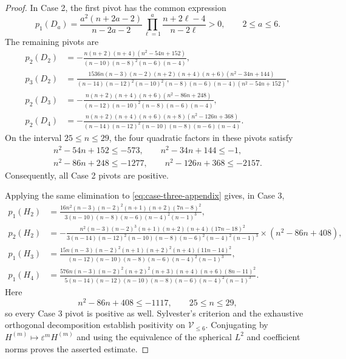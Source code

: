 \documentclass[11pt]{article}
\numberwithin{equation}{section}
\theoremstyle{remark}
\begin{document}
\begin{proof}
 In Case  2, the first pivot has the common expression
{
\begin{equation*}
 p_1(D_a)=\frac{a^2(n+2a-2)}{n-2a-2}
 \prod_{\ell=1}^a\frac{n+2\ell-4}{n-2\ell}>0,
 \qquad 2\le a\le6.
\end{equation*}
}
 The remaining pivots are
{
\begin{align*}
 p_2(D_2)
 &=-\frac{n(n+2)(n+4)(n^2-54n+152)}
 {(n-10)(n-8)^2(n-6)(n-4)},\\
 p_3(D_2)
 &=\frac{1536n(n-3)(n-2)(n+2)(n+4)(n+6)(n^2-34n+144)}
 {(n-14)(n-12)^2(n-10)^2(n-8)(n-6)(n-4)(n^2-54n+152)},\\
 p_2(D_3)
 &=-\frac{n(n+2)(n+4)(n+6)(n^2-86n+248)}
 {(n-12)(n-10)^2(n-8)(n-6)(n-4)},\\
 p_2(D_4)
 &=-\frac{n(n+2)(n+4)(n+6)(n+8)(n^2-126n+368)}
 {(n-14)(n-12)^2(n-10)(n-8)(n-6)(n-4)}.
\end{align*}
}
 On the interval $25\le n\le29$, the four quadratic factors in these
pivots satisfy
{
\begin{equation*}
\begin{gathered}
 n^2-54n+152\le-573,
 \qquad n^2-34n+144\le-1,\\
 n^2-86n+248\le-1277,
 \qquad n^2-126n+368\le-2157.
\end{gathered}
\end{equation*}
}
Consequently, all Case  2 pivots are positive.

Applying the same elimination to
\eqref{eq:case-three-appendix} gives, in Case  3,
{
\begin{align*}
 p_1(H_2)
 &=\frac{16n^2(n-3)(n-2)^2(n+1)(n+2)(7n-8)^2}
 {3(n-10)(n-8)(n-6)(n-4)^2(n-1)^3},\\
 p_2(H_2)
 &=-\frac{n^2(n-3)(n-2)^3(n+1)(n+2)(n+4)(17n-18)^2}
 {3(n-14)(n-12)^2(n-10)(n-8)(n-6)^2(n-4)^2(n-1)^3}\times(n^2-86n+408),\\
 p_1(H_3)
 &=\frac{15n(n-3)(n-2)^2(n+1)(n+2)^2(n+4)(11n-14)^2}
 {(n-12)(n-10)(n-8)(n-6)(n-4)^2(n-1)^3},\\
 p_1(H_4)
 &=\frac{576n(n-3)(n-2)^2(n+2)^2(n+3)(n+4)(n+6)(8n-11)^2}
 {5(n-14)(n-12)(n-10)(n-8)(n-6)(n-4)^2(n-1)^3}.
\end{align*}
}
Here
 {
\begin{equation*}
 n^2-86n+408\le-1117,
 \qquad 25\le n\le29,
\end{equation*}
}
so every Case  3 pivot is positive as well.  Sylvester's criterion and
the  exhaustive orthogonal decomposition {establish positivity on}
$\mathcal V_{\le6}$.  Conjugating by
$H^{(m)}\mapsto\varepsilon^mH^{(m)}$ and using the equivalence of the
spherical $L^2$ and coefficient norms proves the asserted estimate.
\end{proof}
\end{document}
